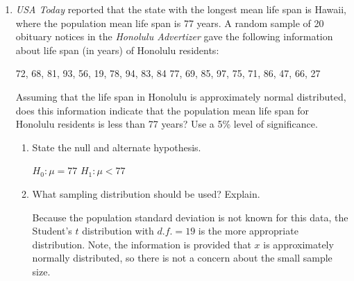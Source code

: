\begin{enumerate}
\begin{enumerate}
	{\answer $H_0: \mu = 19$ 
	$H_1: \mu <19$ 
	This is a left-tailed test.} 
	
	\item If we assume that $x$ has a normal distribution and that the sample standard deviation is $s = 4.52$, then the corresponding $P$-value is about $0.0699$. Verify this is correct using the appropriate statistical test. At the $\alpha = 0.05$ level, do these data indicate that the P/E ratio of all U.S. bank stocks is less than 19? 
	
	{\answer Using \texttt{T-Test}, one verifies that the $P$-value is about $0.0699$. Since $P>\alpha$, at the $0.05$ significance level, we FAIL TO REJECT the null hypothesis. In other words, the data is not strong enough to suggest that the P/E ration of all U.S. bank stocks is less than 19.} 
	\vspace{1cm}
	
	\end{enumerate}

\vfill

\newpage

\item {\em USA Today} reported that the state with the longest mean life span is Hawaii, where the population mean life span is 77 years. A random sample of 20 obituary notices in the {\em Honolulu Advertizer} gave the following information about life span (in years) of Honolulu residents:
	\begin{center}
	72, 68, 81, 93, 56, 19, 78, 94, 83, 84  
	77, 69, 85, 97, 75, 71, 86, 47, 66, 27 
	\end{center}
Assuming that the life span in Honolulu is approximately normal distributed, does this information indicate that the population mean life span for Honolulu residents is less than 77 years? Use a 5\% level of significance.
	\begin{enumerate}
	\item State the null and alternate hypothesis.  
	
	{\answer $H_0 : \mu = 77$  
	$H_1: \mu < 77$}  
	
	\item What sampling distribution should be used? Explain.  
	
	{\answer Because the population standard deviation is not known for this data, the Student's $t$ distribution with $d.f.= 19$ is the more appropriate distribution. Note, the information is provided that $x$ is approximately normally distributed, so there is not a concern about the small sample size.}  
	

\end{enumerate}
\end{enumerate}
